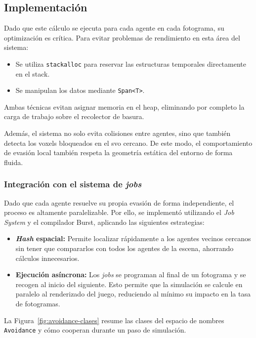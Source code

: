 \subsection{Implementación}

Dado que este cálculo se ejecuta para cada agente en cada fotograma, su optimización es crítica.
Para evitar problemas de rendimiento en esta área del sistema:

\begin{itemize}
  \item Se utiliza \texttt{stackalloc} para reservar las estructuras temporales directamente en el \gls{stack}.
  \item Se manipulan los datos mediante \texttt{Span\textless T\textgreater}.
\end{itemize}

Ambas técnicas evitan asignar memoria en el \gls{heap}, eliminando por completo la carga de trabajo sobre el recolector de basura.

Además, el sistema no solo evita colisiones entre agentes, sino que también detecta los \glspl{voxel} bloqueados en el \acrshort{svo} cercano.
De este modo, el comportamiento de evasión local también respeta la geometría estática del entorno de forma fluida.

\subsubsection{Integración con el sistema de \textit{jobs}}

Dado que cada agente resuelve su propia evasión de forma independiente, el proceso es altamente paralelizable.
Por ello, se implementó utilizando el \textit{Job System} y el compilador Burst, aplicando las siguientes estrategias:

\begin{itemize}
  \item \textbf{\textit{Hash} espacial:} Permite localizar rápidamente a los agentes vecinos cercanos sin tener que compararlos con todos los agentes de la escena, ahorrando cálculos innecesarios.
  \item \textbf{Ejecución asíncrona:} Los \textit{jobs} se programan al final de un fotograma y se recogen al inicio del siguiente. Esto permite que la simulación se calcule en paralelo al renderizado del juego, reduciendo al mínimo su impacto en la tasa de fotogramas.
\end{itemize}

La Figura~\ref{fig:avoidance-clases} resume las clases del espacio de nombres \texttt{Avoidance} y cómo cooperan durante un paso de simulación.

